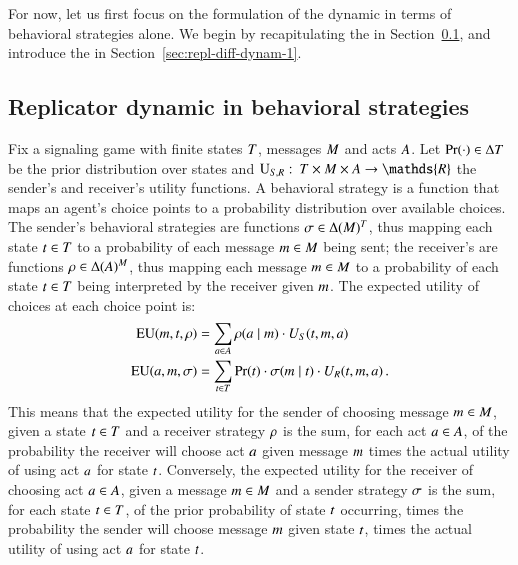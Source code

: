 \documentclass[fleqn,reqno,10pt]{article}
\newcommand{\rd}{\acro{rd}} %
\newcommand{\rmd}{\acro{rmd}} %
\newcommand{\rdd}{\acro{rdd}} %
\begin{document}
For now, let us first focus on the
formulation of the dynamic in terms of behavioral strategies alone.
We begin by recapitulating the \rd in
Section~\ref{sec:repl-dynam-behav}, and introduce the \rdd in
Section~\ref{sec:repl-diff-dynam-1}.

\subsection{Replicator dynamic in behavioral strategies}
\label{sec:repl-dynam-behav}

Fix a signaling game with finite states $T$, messages $M$
and acts $A$. Let $\Pr(\cdot) \in \Delta{\ensuremath{T}}$ be the prior
distribution over states and $\Util_{\sen,\rec} \mycolon \States
\times \Messgs \times \Acts \rightarrow \mathds{R}$ the sender's and
receiver's utility functions. A behavioral strategy is a function that
maps an agent's choice points to a probability distribution over
available choices. The sender's behavioral strategies are functions
$\sigma \in \Delta(M)^T$, thus mapping each state $t \in T$ to a probability of each message $m \in M$ being sent; the receiver's are functions
$\rho \in \Delta(A)^M$, thus mapping each message $m \in M$ to a probability of each state $t \in T$ being interpreted by the receiver given $m$. The expected utility of choices
at each choice point is:
\begin{align*}
  \mathrm{EU}(m, t, \rho) & = \sum_{a \in A}
  \rho(a \mid m) \cdot U_S(t, m, a) \\
  \mathrm{EU}(a, m, \sigma) & = \sum_{t \in
    T} \Pr(t) \cdot \sigma(m \mid t) \cdot
  U_R(t, m, a) \,.
\end{align*}
This means that the expected utility for the sender of choosing message $m \in M$, given a state $t \in T$ and a receiver strategy $\rho$ is the sum, for each act $a \in A$, of the probability the receiver will choose act $a$ given message $m$ times the actual utility of using act $a$ for state $t$.
Conversely, the expected utility for the receiver of choosing act $a \in A$, given a message $m \in M$ and a sender strategy $\sigma$ is the sum, for each state $t \in T$, of the prior probability of state $t$ occurring, times the probability the sender will choose message $m$ given state $t$, times the actual utility of using act $a$ for state $t$.
\end{document}
